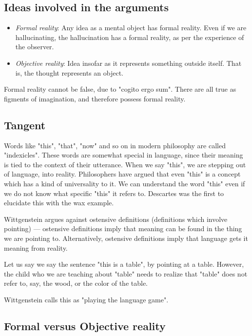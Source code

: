 \documentclass[11pt]{book}
\begin{document}
\subsection{Ideas involved in the arguments}

\begin{itemize}
    \item \emph{Formal reality}: Any idea as a mental object has formal reality. Even
        if we are hallucinating, the hallucination has a formal reality, as per
        the experience of the observer.
    \item \emph{Objective reality}: Idea insofar as it represents something outside
        itself. That is, the thought represents an object.
\end{itemize}

Formal reality cannot be false, due to "cogito ergo sum". There are all true as
figments of imagination, and therefore possess formal reality.

\subsection{Tangent}
Words like "this", "that", "now" and so on in modern philosophy are called
"indexicles". These words are somewhat special in language, since their meaning
is tied to the context of their utterance. When we say "this", we are stepping
out of language, into reality. Philosophers have argued that even "this" is a
concept which has a kind of universality to it. We can understand the word
"this" even if we do not know what specific "this" it refers to. Descartes was
the first to elucidate this with the wax example.

Wittgenstein argues against ostensive definitions (definitions which involve
pointing) --- ostensive definitions imply that meaning can be found in the
thing we are pointing to.  Alternatively, ostensive definitions imply that
language gets it meaning from reality. 

Let us say we say the sentence "this is a table", by pointing at a table.
However, the child who we are teaching about "table" needs to realize that
"table" does not refer to, say, the wood, or the color of the table.  

Wittgenstein calls this as "playing the language game".

\subsection{Formal versus Objective reality}
\end{document}

